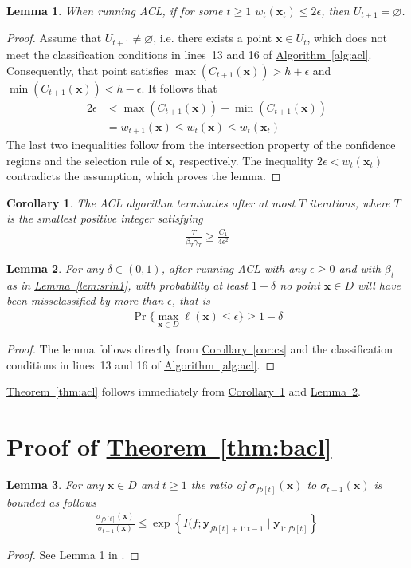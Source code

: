 \documentclass{article}
\def\*#1{\bm{#1}}
\newcommand{\algoref}[1]{\hyperref[#1]{\mbox{Algorithm~\ref*{#1}}}}
\newcommand{\theoremref}[1]{\hyperref[#1]{\mbox{Theorem~\ref*{#1}}}}
\newcommand{\lemmaref}[1]{\hyperref[#1]{\mbox{Lemma~\ref*{#1}}}}
\newcommand{\corref}[1]{\hyperref[#1]{\mbox{Corollary~\ref*{#1}}}}
\newtheorem{lemma}{Lemma}
\newtheorem{cor}{Corollary}
\newcommand{\acl}{\textsf{ACL}\xspace}
\begin{document}
\begin{lemma}
When running \acl, if for some $t \geq 1$ $w_t(\*x_t) \leq 2\epsilon$,
then $U_{t+1} = \varnothing$.
\end{lemma}
\begin{proof}
Assume that $U_{t+1} \neq \varnothing$, i.e. there exists a point
$\*x \in U_t$, which does not meet the classification conditions in
lines~13 and 16 of \algoref{alg:acl}. Consequently, that point
satisfies $\max(C_{t+1}(\*x)) > h + \epsilon$ and
$\min(C_{t+1}(\*x)) < h - \epsilon$. It follows that
\begin{align*}
2\epsilon &< \max(C_{t+1}(\*x)) - \min(C_{t+1}(\*x))\\
&= w_{t+1}(\*x) \leq w_t(\*x) \leq w_t(\*x_t)
\end{align*}
The last two inequalities follow from the intersection property of
the confidence regions and the selection rule of $\*x_t$ respectively.
The inequality $2\epsilon < w_t(\*x_t)$ contradicts the assumption, which
proves the lemma.
\end{proof}

\begin{cor}
\label{cor:iter}
The \acl algorithm terminates after at most $T$ iterations, where $T$
is the smallest positive integer satisfying
\begin{align*}
\frac{T}{\beta_T \gamma_T} \geq \frac{C_1}{4\epsilon^2}
\end{align*}
\end{cor}

\begin{lemma}
\label{lem:prob}
For any $\delta \in (0, 1)$, after running \acl with any $\epsilon \geq 0$
and with $\beta_t$ as in \lemmaref{lem:srin1}, with probability at least
$1-\delta$ no point $\*x \in D$ will have been missclassified by more
than $\epsilon$, that is
\begin{align*}
\Pr\{\max_{\*x\in D}\ell(\*x) \leq \epsilon\} \geq 1 - \delta
\end{align*}
\end{lemma}
\begin{proof}
The lemma follows directly from \corref{cor:cs} and the classification
conditions in lines~13 and 16 of \algoref{alg:acl}.
\end{proof}

\theoremref{thm:acl} follows immediately from \corref{cor:iter}
and \lemmaref{lem:prob}.

\section{Proof of \theoremref{thm:bacl}}
\begin{lemma}
\label{lem:cmi}
For any $\*x \in D$ and $t \geq 1$
the ratio of $\sigma_{fb[t]}(\*x)$ to $\sigma_{t-1}(\*x)$ is bounded
as follows
\begin{align*}
\frac{\sigma_{fb[t]}(\*x)}{\sigma_{t-1}(\*x)} \leq \exp\left\{I(f; \*y_{fb[t]+1:t-1} \mid \*y_{1:fb[t]}\right\}
\end{align*}
\end{lemma}
\begin{proof}
See Lemma 1 in \cite{desautels2012}.
\end{proof}
\end{document}

